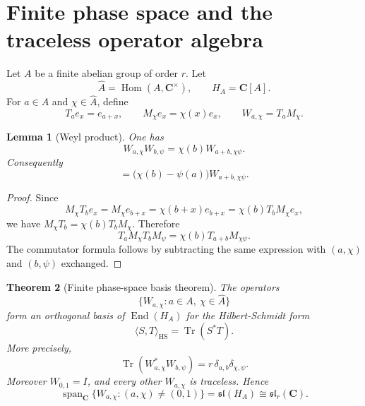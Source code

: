 \documentclass[11pt]{article}
\newcommand{\C}{\mathbf C}
\newcommand{\Tr}{\operatorname{Tr}}
\newcommand{\End}{\operatorname{End}}
\newcommand{\Hom}{\operatorname{Hom}}
\newcommand{\Span}{\operatorname{span}}
\newcommand{\1}{\mathbf 1}
\newcommand{\HS}{\mathrm{HS}}
\newtheorem{theorem}{Theorem}[section]
\newtheorem{lemma}[theorem]{Lemma}
\numberwithin{equation}{section}
\begin{document}
\section{Finite phase space and the traceless operator algebra}\label{sec:phase-space}

Let $A$ be a finite abelian group of order $r$.  Let
\begin{equation}
  \widehat A=\Hom(A,\C^\times),
  \qquad
  H_A=\C[A].
\end{equation}
For $a\in A$ and $\chi\in\widehat A$, define
\begin{equation}
  T_a e_x=e_{a+x},
  \qquad
  M_\chi e_x=\chi(x)e_x,
  \qquad
  W_{a,\chi}=T_aM_\chi.
\end{equation}

\begin{lemma}[Weyl product]\label{lem:weyl-product}
One has
\begin{equation}
  W_{a,\chi}W_{b,\psi}=\chi(b)W_{a+b,\chi\psi}.
\end{equation}
Consequently
\begin{equation}
  [W_{a,\chi},W_{b,\psi}]
  =\bigl(\chi(b)-\psi(a)\bigr)W_{a+b,\chi\psi}.
\end{equation}
\end{lemma}

\begin{proof}
Since
\begin{equation}
  M_\chi T_b e_x=M_\chi e_{b+x}=\chi(b+x)e_{b+x}=\chi(b)T_bM_\chi e_x,
\end{equation}
we have $M_\chi T_b=\chi(b)T_bM_\chi$.  Therefore
\begin{equation}
  T_aM_\chi T_bM_\psi=\chi(b)T_{a+b}M_{\chi\psi}.
\end{equation}
The commutator formula follows by subtracting the same expression with $(a,\chi)$ and $(b,\psi)$ exchanged.
\end{proof}

\begin{theorem}[Finite phase-space basis theorem]\label{thm:phase-space-basis}
The operators
\begin{equation}
  \{W_{a,\chi}:a\in A,\ \chi\in\widehat A\}
\end{equation}
form an orthogonal basis of $\End(H_A)$ for the Hilbert-Schmidt form
\begin{equation}
  \langle S,T\rangle_{\HS}=\Tr(S^*T).
\end{equation}
More precisely,
\begin{equation}
  \Tr(W_{a,\chi}^*W_{b,\psi})=r\,\delta_{a,b}\delta_{\chi,\psi}.
\end{equation}
Moreover $W_{0,1}=I$, and every other $W_{a,\chi}$ is traceless.  Hence
\begin{equation}\label{eq:phase-sl}
  \Span_\C\{W_{a,\chi}:(a,\chi)\ne(0,1)\}
  =\mathfrak{sl}(H_A)\cong\mathfrak{sl}_r(\C).
\end{equation}
\end{theorem}
\end{document}
